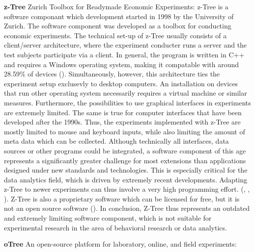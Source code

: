 \textbf{z-Tree} Zurich Toolbox for Readymade Economic Experiments:
z-Tree is a software componant which development started in 1998 by the University of Zurich. The software component was developed as a toolbox for conducting economic experiments. The technical set-up of z-Tree usually consists of a client/server architecture, where the experiment conducter runs a server and the test subjects participate via a client. In general, the program is written in C++ and requires a Windows operating system, making it compatable with around 28.59\% of devices (\cite{statcounter.2023}). Simultaneously, however, this architecture ties the experiment setup exclusevly to desktop computers. An installation on devices that run other operating system necessarily requires a virtual machine or similar measures. Furthermore, the possibilities to use graphical interfaces in experiments are extremely limited. The same is true for computer interfaces that have been developed after the 1990s. Thus, the experiments implemented with z-Tree are mostly limited to mouse and keyboard inputs, while also limiting the amount of meta data which can be collected. Although technically all interfaces, data sources or other programs could be integrated, a software component of this age represents a significantly greater challenge for most extensions than applications designed under new standards and technologies. This is especially critical for the data analytics field, which is driven by extremely recent developments. Adapting z-Tree to newer experiments can thus involve a very high programming effort. (\cite{Zurich.2023}, \cite{Fischbacher.2006}, \cite{Chen.2016}). Z-Tree is also a proprietary software which can be licensed for free, but it is not an open source software (\cite{Fischbacher.2006}). In conclusion, Z-Tree thus represents an outdated and extremely limiting software component, which is not suitable for experimental research in the area of behavioral research or data analytics.

\textbf{oTree} An open-source platform for laboratory, online, and field experiments:

